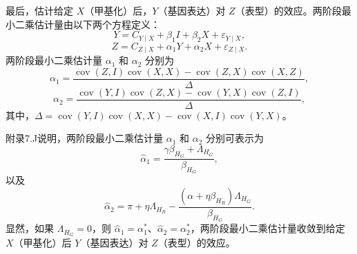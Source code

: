 最后，估计给定 $X$（甲基化）后，$Y$（基因表达）对 $Z$（表型）的效应。两阶段最小二乘估计量由以下两个方程定义：
\begin{equation}
Y=C_{Y\mid X}+\beta_1I+\beta_2X+\varepsilon_{Y\mid X},
\tag{7.343}
\end{equation}
\begin{equation}
Z=C_{Z\mid X}+\alpha_1Y+\alpha_2X+\varepsilon_{Z\mid X}.
\tag{7.344}
\end{equation}
两阶段最小二乘估计量 $\alpha_1$ 和 $\alpha_2$ 分别为
\begin{equation}
\alpha_1=\frac{\operatorname{cov}(Z,I)\operatorname{cov}(X,X)-\operatorname{cov}(Z,X)\operatorname{cov}(X,Z)}{\Delta},
\tag{7.345}
\end{equation}
\begin{equation}
\alpha_2=\frac{\operatorname{cov}(Y,I)\operatorname{cov}(Z,X)-\operatorname{cov}(Y,X)\operatorname{cov}(Z,I)}{\Delta},
\tag{7.346}
\end{equation}
其中，$\Delta=\operatorname{cov}(Y,I)\operatorname{cov}(X,X)-\operatorname{cov}(X,I)\operatorname{cov}(Y,X)$。

附录7.J说明，两阶段最小二乘估计量 $\alpha_1$ 和 $\alpha_2$ 分别可表示为
\begin{equation}
\widehat\alpha_1=\frac{\gamma\beta_{H_G}+\Lambda_{H_G}}{\beta_{H_G}},
\tag{7.347}
\end{equation}
以及
\begin{equation}
\widehat\alpha_2=\pi+\eta\Lambda_{H_R}-\frac{(\alpha+\eta\beta_{H_R})\Lambda_{H_G}}{\beta_{H_G}}.
\tag{7.348}
\end{equation}
显然，如果 $\Lambda_{H_G}=0$，则 $\widehat\alpha_1=\alpha_1^*$、$\widehat\alpha_2=\alpha_2^*$，两阶段最小二乘估计量收敛到给定 $X$（甲基化）后 $Y$（基因表达）对 $Z$（表型）的效应。
